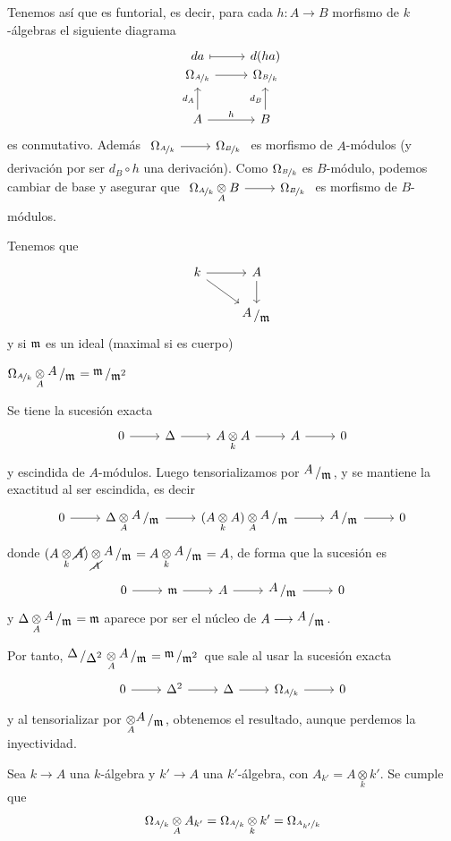 Tenemos as\'i que es funtorial, es decir, para cada $h: A \longrightarrow B$ morfismo de $k$-\'algebras el siguiente diagrama
$$\bt da \rarmaps & d(ha) \\[-7mm] \Omega_{\nicefrac{A}{k}} \rar & \Omega_{\nicefrac{B}{k}}  \\ A \arrow{u}{d_A} \rar{h} & B \arrow{u}{d_B} \et$$
es conmutativo. Adem\'as $\bt\Omega_{\nicefrac{A}{k}} \rar & \Omega_{\nicefrac{B}{k}} \et$ es morfismo de $A$-m\'odulos (y derivaci\'on por ser $d_B \circ h$ una derivaci\'on). Como $\Omega_{\nicefrac{B}{k}}$ es $B$-m\'odulo, podemos cambiar de base y asegurar que $\bt\Omega_{\nicefrac{A}{k}} \underset{A}{\otimes} B \rar & \Omega_{\nicefrac{B}{k}} \et$ es morfismo de $B$-m\'odulos.

Tenemos que $$\bt k \rar \arrow{dr} & A\arrow{d} \\ & \modulo{A}{\m} \et$$ y si $\mathfrak{m}$ es un ideal (maximal si es cuerpo)
\begin{teo}
    $\Omega_{\nicefrac{A}{k}} \underset{A}{\otimes} \modulo{A}{\m} = \modulo{\m}{\m^2}$
\end{teo}
\begin{dem}
    Se tiene la sucesi\'on exacta
    $$\bt 0\rar &  \Delta \rar & A \underset{k}{\otimes} A \rar &  A \rar & 0\et$$
    y escindida de $A$-m\'odulos. Luego tensorializamos por $\modulo{A}{\m}$, y se mantiene la exactitud al ser escindida, es decir
    $$\bt 0\rar & \Delta \underset{A}{\otimes} \modulo{A}{\m} \rar & (A \underset{k}{\otimes} A)\underset{A}{\otimes} \modulo{A}{\m} \rar & \modulo{A}{\m} \rar & 0\et$$
    donde $(A \underset{k}{\otimes} \cancel{A})\underset{\cancel{A}}{\otimes} \modulo{A}{\m} = A\underset{k}{\otimes} \modulo{A}{\m} = A$, de forma que la sucesi\'on es
    $$\bt 0\rar &  \m \rar & A \rar &  \modulo{A}{\m} \rar & 0\et$$
    y $\Delta \underset{A}{\otimes} \modulo{A}{\m} = \m$ aparece por ser el n\'ucleo de $A \longrightarrow \modulo{A}{\m}$. 

    Por tanto, $\modulo{\Delta}{\Delta^2} \underset{A}{\otimes} \modulo{A}{\m} = \modulo{\m}{\m^2}$ que sale al usar la sucesi\'on exacta
    $$\bt 0\rar &  \Delta^2 \rar & \Delta \rar &  \Omega_{\nicefrac{A}{k}} \rar & 0\et$$
    y al tensorializar por $\underset{A}{\otimes} \modulo{A}{\m}$, obtenemos el resultado, aunque perdemos la inyectividad.
\end{dem}
\begin{teo}
    Sea $k \longrightarrow A$ una $k$-\'algebra y $k'\longrightarrow A$ una $k'$-\'algebra, con $A_{k'} = A \underset{k}{\otimes} k'$. Se cumple que 
    $$\Omega_{\nicefrac{A}{k}} \underset{A}{\otimes} A_{k'} = \Omega_{\nicefrac{A}{k}} \underset{k}{\otimes} k' = \Omega_{\nicefrac{A_{k'}}{k}}$$
\end{teo}

